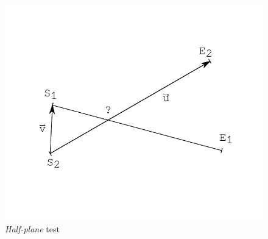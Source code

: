 	

\begin{figure}[h]
  \centering
  \includegraphics[width=12cm]{./pictures/2/half-plane_vector.pdf}
  \caption{\textit{Half-plane} test}
  \label{fig:2-half_plane_vector}
\end{figure}

